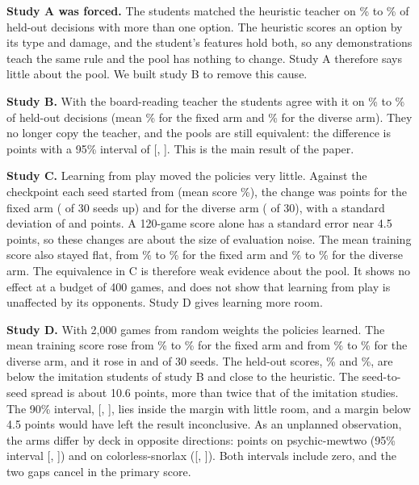 \documentclass[conference]{IEEEtran}
\begin{document}
\textbf{Study A was forced.} The students matched the heuristic teacher on \AAgreeMin\% to \AAgreeMax\% of held-out decisions with more than one option. The heuristic scores an option by its type and damage, and the student's features hold both, so any demonstrations teach the same rule and the pool has nothing to change. Study A therefore says little about the pool. We built study B to remove this cause.

\textbf{Study B.} With the board-reading teacher the students agree with it on \BAgreeMin\% to \BAgreeMax\% of held-out decisions (mean \BAgreeFixedMean\% for the fixed arm and \BAgreeDiverseMean\% for the diverse arm). They no longer copy the teacher, and the pools are still equivalent: the difference is \BDelta{} points with a 95\% interval of [\BCIlow, \BCIhigh]. This is the main result of the paper.

\textbf{Study C.} Learning from play moved the policies very little. Against the checkpoint each seed started from (mean score \StartMean\%), the change was \CChangeFixed{} points for the fixed arm (\CUpFixed{} of 30 seeds up) and \CChangeDiverse{} for the diverse arm (\CUpDiverse{} of 30), with a standard deviation of \CChangeFixedSD{} and \CChangeDiverseSD{} points. A 120-game score alone has a standard error near 4.5 points, so these changes are about the size of evaluation noise. The mean training score also stayed flat, from \CTrainFirstFixed\% to \CTrainLastFixed\% for the fixed arm and \CTrainFirstDiverse\% to \CTrainLastDiverse\% for the diverse arm. The equivalence in C is therefore weak evidence about the pool. It shows no effect at a budget of 400 games, and does not show that learning from play is unaffected by its opponents. Study D gives learning more room.

\textbf{Study D.} With 2,000 games from random weights the policies learned. The mean training score rose from \DTrainFirstFixed\% to \DTrainLastFixed\% for the fixed arm and from \DTrainFirstDiverse\% to \DTrainLastDiverse\% for the diverse arm, and it rose in \DUpFixed{} and \DUpDiverse{} of 30 seeds. The held-out scores, \DFixedMean\% and \DDiverseMean\%, are below the imitation students of study B and close to the heuristic. The seed-to-seed spread is about 10.6 points, more than twice that of the imitation studies. The 90\% interval, [\DNinetyLow, \DNinetyHigh], lies inside the margin with little room, and a margin below 4.5 points would have left the result inconclusive. As an unplanned observation, the arms differ by deck in opposite directions: \DMewtwoGap{} points on psychic-mewtwo (95\% interval [\DMewtwoGapLow, \DMewtwoGapHigh]) and \DSnorlaxGap{} on colorless-snorlax ([\DSnorlaxGapLow, \DSnorlaxGapHigh]). Both intervals include zero, and the two gaps cancel in the primary score.
\end{document}
